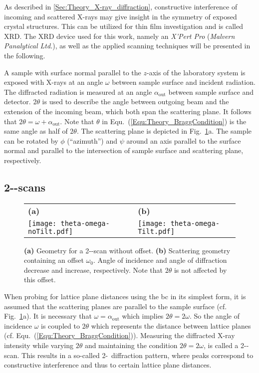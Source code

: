 As described in \ref{Sec:Theory_X-ray_diffraction}, constructive interference of incoming and scattered X-rays may give insight in the symmetry of exposed crystal structures.
This can be utilized for thin film investigation and is called \gls{XRD}.
The \gls{XRD} device used for this work, namely an \textit{X'Pert Pro} (\textit{Malvern Panalytical Ltd.}), as well as the applied scanning techniques will be presented in the following.

A sample with surface normal parallel to the $z$-axis of the laboratory system is exposed with X-rays at an angle $\omega$ between sample surface and incident radiation.
The diffracted radiation is measured at an angle $\alpha_\mathrm{out}$ between sample surface and detector.
$2\theta$ is used to describe the angle between outgoing beam and the extension of the incoming beam, which both span the scattering plane.
It follows that $2\theta=\omega+\alpha_\mathrm{out}$.
Note that $\theta$ in Equ.~(\ref{Equ:Theory_BraggCondition}) is the same angle as half of $2\theta$.
The scattering plane is depicted in Fig.~\ref{Fig:Methods_XRD_geometry}a.
The sample can be rotated by $\phi$ (\enquote{azimuth}) and $\psi$ around an axis parallel to the surface normal and parallel to the intersection of sample surface and scattering plane, respectively.

\subsection{2\texttheta-\textomega-scans}
    \label{Sec:Methods_2ThetaOmega}
\begin{figure}
    \centering
    \begin{tabular}{ll}
        \textbf{(a)}&\textbf{(b)}\\
        \texttt{[image: theta-omega-noTilt.pdf]}
        &\texttt{[image: theta-omega-Tilt.pdf]}
    \end{tabular}
    \caption{\textbf{(a)} Geometry for a 2\texttheta-\textomega-scan without offset. \textbf{(b)} Scattering geometry containing an offset $\omega_0$. Angle of incidence and angle of diffraction decrease and increase, respectively. Note that $2\theta$ is not affected by this offset.}
    \label{Fig:Methods_XRD_geometry}
\end{figure}
When probing for lattice plane distances using the \gls{bc} in its simplest form, it is assumed that the scattering planes are parallel to the sample surface (cf. Fig.~\ref{Fig:Methods_XRD_geometry}a).
It is necessary that $\omega=\alpha_\mathrm{out}$ which implies $2\theta=2\omega$.
So the angle of incidence $\omega$ is coupled to $2\theta$ which represents the distance between lattice planes (cf. Equ.~(\ref{Equ:Theory_BraggCondition})).
Measuring the diffracted X-ray intensity while varying $2\theta$ and maintaining the condition $2\theta=2\omega$, is called a 2\texttheta-\textomega-scan.
This results in a so-called 2\texttheta-\textomega\ diffraction pattern, where peaks correspond to constructive interference and thus to certain lattice plane distances.

